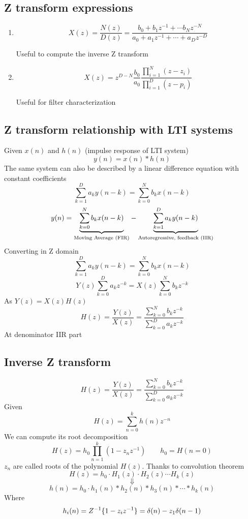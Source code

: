 \subsection{Z transform expressions}
\begin{enumerate}
    \item 
    \begin{LARGE}
        $$
        X(z)=\frac{N(z)}{D(z)}=\frac{
            b_0+b_1z^{-1}+\cdots b_Nz^{-N}
        }{
            a_0+a_1z^{-1}+\cdots+a_Dz^{-D}
        }
        $$
    \end{LARGE}
    Useful to compute the inverse Z transform
    \item
    \begin{LARGE}
        $$
            X(z)=z^{D-N}\frac{b_0}{a_0}\frac{
                \prod_{i=1}^N(z-z_i)
            }{\prod_{i=1}^D(z-p_i)}
        $$
    \end{LARGE}
    Useful for filter characterization
\end{enumerate}

\subsection{Z transform relationship with LTI systems}
Given $x(n)$ and $h(n)$ (impulse response of LTI system)
$$y(n)=x(n)*h(n)$$
The same system can also be described by a linear difference equation with constant coefficients
    $$
    \sum_{k=1}^Da_ky(n-k)=
    \sum_{k=0}^Nb_kx(n-k)
    $$
    $$
    y(n)=\underlabel{\sum_{k=0}^Nb_kx(n-k)}{Moving Average (FIR)}-
    \underlabel{\sum_{k=1}^Da_ky(n-k)}{Autoregressive, feedback (IIR)}
    $$
Converting in Z domain
    $$
    \sum_{k=1}^Da_ky(n-k)=
    \sum_{k=0}^Nb_kx(n-k)
    $$
    $$
    Y(z)\sum_{k=0}^Da_kz^{-k}=
    X(z)\sum_{k=0}^Nb_kz^{-k}
    $$
As $Y(z)=X(z)H(z)$
$$
H(z)=\frac{Y(z)}{X(z)}=\frac{\sum_{k=0}^Nb_kz^{-k}}{\sum_{k=0}^Da_kz^{-k}}
$$
At denominator IIR part

\subsection{Inverse Z transform}
$$
H(z)=\frac{Y(z)}{X(z)}=\frac{\sum_{k=0}^Nb_kz^{-k}}{\sum_{k=0}^Da_kz^{-k}}
$$
Given
$$
H(z)=\sum_{n=0}^kh(n)z^{-n}
$$
We can compute its root decomposition
$$
H(z)=h_0\prod_{n=1}^k(1-z_nz^{-1})\qquad h_0=H(n=0)
$$
$z_n$ are called roots of the polynomial $H(z)$. Thanks to convolution theorem
$$
H(z)=h_0\cdot H_1(z)\cdot H_2(z)\cdots H_k(z)
$$
$$
\Downarrow
$$
$$
h(n)=h_0\cdot h_1(n)*h_2(n)*h_3(n)*\cdots*h_k(n)
$$
Where
$$
h_i(n)=Z^{-1}\brackets{1-z_iz^{-1}}=\delta(n)-z_1\delta(n-1)
$$

